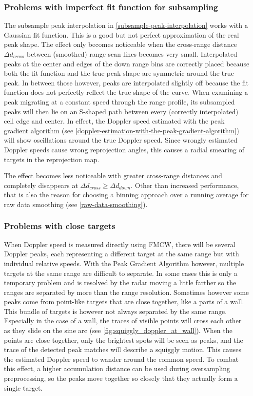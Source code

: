 \subsubsection{Problems with imperfect fit function for subsampling} \label{problems-with-imperfect-fit-function-for-subsampling}
The subsample peak interpolation in \cref{subsample-peak-interpolation} works with a Gaussian fit function. This is a good but not perfect approximation of the real peak shape. The effect only becomes noticeable when the cross-range distance $\Delta d_{cross}$ between (smoothed) range scan lines becomes very small. Interpolated peaks at the center and edges of the down range bins are correctly placed because both the fit function and the true peak shape are symmetric around the true peak. In between those however, peaks are interpolated slightly off because the fit function does not perfectly reflect the true shape of the curve. When examining a peak migrating at a constant speed through the range profile, its subsampled peaks will then lie on an S-shaped path between every (correctly interpolated) cell edge and center. In effect, the Doppler speed estimated with the peak gradient algorithm (see \cref{doppler-estimation-with-the-peak-gradient-algorithm}) will show oscillations around the true Doppler speed. Since wrongly estimated Doppler speeds cause wrong reprojection angles, this causes a radial smearing of targets in the reprojection map.

The effect becomes less noticeable with greater cross-range distances and completely disappears at $\Delta d_{cross} \ge \Delta d_{down}$. Other than increased performance, that is also the reason for choosing a binning approach over a running average for raw data smoothing (see \cref{raw-data-smoothing}).

\subsubsection{Problems with close targets}\label{problems-with-close-targets}

When Doppler speed is measured directly using FMCW, there will be
several Doppler peaks, each representing a different target at the same
range but with individual relative speeds. With the Peak Gradient
Algorithm however, multiple targets at the same range are difficult to
separate. In some cases this is only a temporary problem and is resolved
by the radar moving a little farther so the ranges are separated by more
than the range resolution. Sometimes however some peaks come from
point-like targets that are close together, like a parts of a wall. This
bundle of targets is however not always separated by the same range.
Especially in the case of a wall, the traces of visible points will
cross each other as they slide on the sine arc (see \cref{fig:squiggly_doppler_at_wall}). When the
points are close together, only the brightest spots will be seen as
peaks, and the trace of the detected peak matches will describe a
squiggly motion. This causes the estimated Doppler speed to wander
around the common speed. To combat this effect, a higher accumulation
distance can be used during oversampling preprocessing, so the peaks
move together so closely that they actually form a single target.

